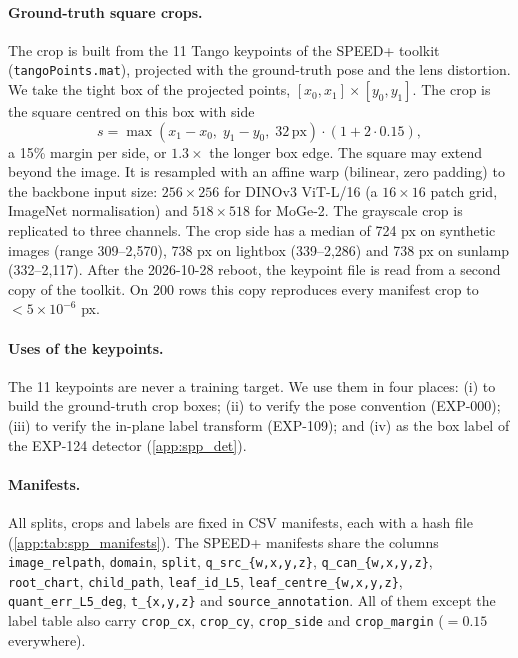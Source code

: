 \paragraph{Ground-truth square crops.}
The crop is built from the 11 Tango keypoints of the SPEED+ toolkit (\texttt{tangoPoints.mat}), projected with the ground-truth pose and the lens distortion. We take the tight box of the projected points, $[x_0,x_1]\times[y_0,y_1]$. The crop is the square centred on this box with side
\begin{equation*}
  s=\max(x_1-x_0,\;y_1-y_0,\;32\,\text{px})\cdot(1+2\cdot0.15),
\end{equation*}
\ie a 15\% margin per side, or $1.3\times$ the longer box edge. The square may extend beyond the image. It is resampled with an affine warp (bilinear, zero padding) to the backbone input size: $256\times256$ for DINOv3 ViT-L/16 (a $16\times16$ patch grid, ImageNet normalisation) and $518\times518$ for MoGe-2. The grayscale crop is replicated to three channels.
The crop side has a median of 724 px on synthetic images (range 309--2{,}570), 738 px on lightbox (339--2{,}286) and 738 px on sunlamp (332--2{,}117).
After the 2026-10-28 reboot, the keypoint file is read from a second copy of the toolkit. On 200 rows this copy reproduces every manifest crop to $<5\times10^{-6}$ px.

\paragraph{Uses of the keypoints.}
The 11 keypoints are never a training target. We use them in four places: (i) to build the ground-truth crop boxes; (ii) to verify the pose convention (EXP-000); (iii) to verify the in-plane label transform (EXP-109); and (iv) as the box label of the EXP-124 detector (\cref{app:spp_det}).

\paragraph{Manifests.}
All splits, crops and labels are fixed in CSV manifests, each with a hash file (\cref{app:tab:spp_manifests}). The SPEED+ manifests share the columns \texttt{image\_relpath}, \texttt{domain}, \texttt{split}, \texttt{q\_src\_\{w,x,y,z\}}, \texttt{q\_can\_\{w,x,y,z\}}, \texttt{root\_chart}, \texttt{child\_path}, \texttt{leaf\_id\_L5}, \texttt{leaf\_centre\_\{w,x,y,z\}}, \texttt{quant\_err\_L5\_deg}, \texttt{t\_\{x,y,z\}} and \texttt{source\_annotation}. All of them except the label table also carry \texttt{crop\_cx}, \texttt{crop\_cy}, \texttt{crop\_side} and \texttt{crop\_margin} ($=0.15$ everywhere).

